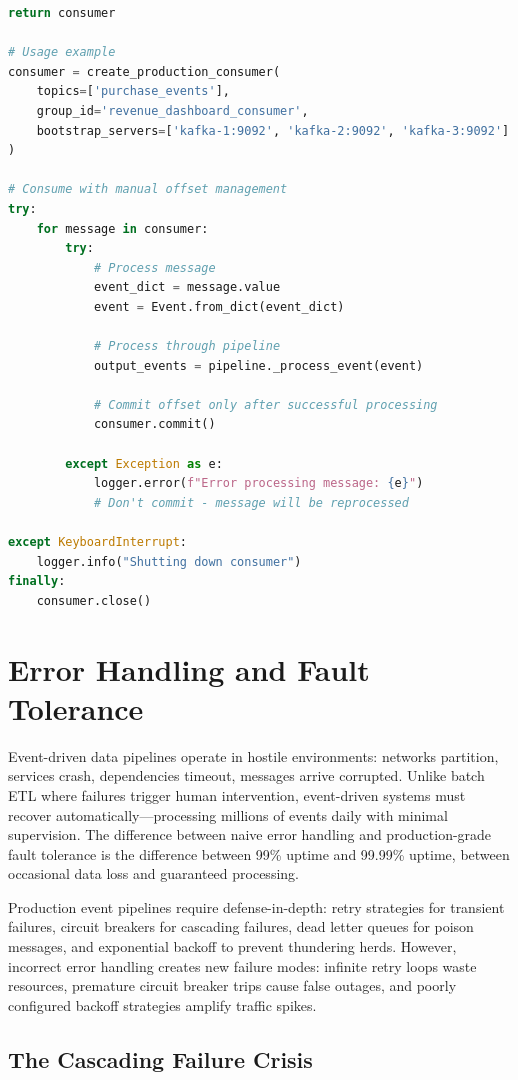 \begin{lstlisting}[language=Python, caption={Production Kafka Consumer Configuration}]
    return consumer

# Usage example
consumer = create_production_consumer(
    topics=['purchase_events'],
    group_id='revenue_dashboard_consumer',
    bootstrap_servers=['kafka-1:9092', 'kafka-2:9092', 'kafka-3:9092']
)

# Consume with manual offset management
try:
    for message in consumer:
        try:
            # Process message
            event_dict = message.value
            event = Event.from_dict(event_dict)

            # Process through pipeline
            output_events = pipeline._process_event(event)

            # Commit offset only after successful processing
            consumer.commit()

        except Exception as e:
            logger.error(f"Error processing message: {e}")
            # Don't commit - message will be reprocessed

except KeyboardInterrupt:
    logger.info("Shutting down consumer")
finally:
    consumer.close()
\end{lstlisting}

\section{Error Handling and Fault Tolerance}

Event-driven data pipelines operate in hostile environments: networks partition, services crash, dependencies timeout, messages arrive corrupted. Unlike batch ETL where failures trigger human intervention, event-driven systems must recover automatically---processing millions of events daily with minimal supervision. The difference between naive error handling and production-grade fault tolerance is the difference between 99\% uptime and 99.99\% uptime, between occasional data loss and guaranteed processing.

Production event pipelines require defense-in-depth: retry strategies for transient failures, circuit breakers for cascading failures, dead letter queues for poison messages, and exponential backoff to prevent thundering herds. However, incorrect error handling creates new failure modes: infinite retry loops waste resources, premature circuit breaker trips cause false outages, and poorly configured backoff strategies amplify traffic spikes.

\subsection{The Cascading Failure Crisis}

